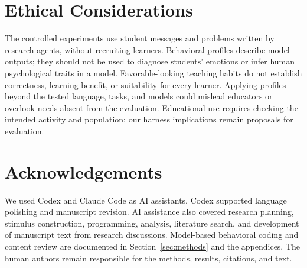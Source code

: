 \section*{Ethical Considerations}
The controlled experiments use student messages and problems written by
research agents, without recruiting learners. Behavioral profiles describe model
outputs; they should not be used to diagnose students' emotions or infer human
psychological traits in a model. Favorable-looking teaching habits do not
establish correctness, learning benefit, or suitability for every learner.
Applying profiles beyond the tested language, tasks, and models could
mislead educators or overlook needs absent from the evaluation. Educational
use requires checking the intended activity and population; our harness
implications remain proposals for evaluation.

\section*{Acknowledgements}
We used Codex and Claude Code as AI assistants. Codex supported language
polishing and manuscript revision. AI assistance also covered research
planning, stimulus construction, programming, analysis, literature search,
and development of manuscript text from research discussions. Model-based
behavioral coding and content review are documented in
Section~\ref{sec:methods} and the appendices. The human authors remain
responsible for the methods, results, citations, and text.
